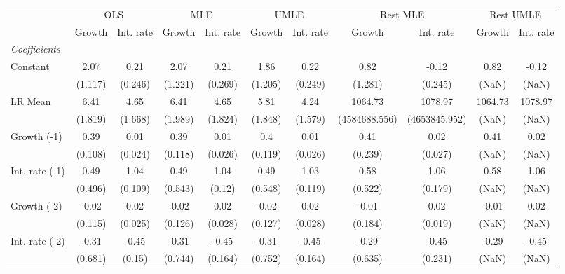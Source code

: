 \begin{table}[htbp] 
	\centering
	\begin{tabular}{@{\extracolsep{4pt}}lcccccccccc@{}}		\hline\hline
		 		 & \multicolumn{2}{c}{OLS} &\multicolumn{2}{c}{MLE} &\multicolumn{2}{c}{UMLE} &\multicolumn{2}{c}{Rest MLE} &\multicolumn{2}{c}{Rest UMLE} \\ 
 		 & Growth 	 & Int. rate 	 & Growth 	 & Int. rate 	 & Growth 	 & Int. rate 	 & Growth 	 & Int. rate 	 & Growth 	 & Int. rate\\\cline{2-3}\cline{4-5}\cline{6-7}\cline{8-9}\cline{10-11}
\rule{0pt}{4ex} 
 \emph{Coefficients} 	  		 & 		 & 		 & 		 & 		 & 		 & 		 & 		 & 		 & 		 &\\ 
\quad Constant 	 & 2.07 	 & 0.21 	 & 2.07 	 & 0.21 	 & 1.86 	 & 0.22 	 & 0.82 	 & -0.12 	 & 0.82 	 & -0.12	 \\ 
 		 & (1.117) 	 & (0.246) 	 & (1.221) 	 & (0.269) 	 & (1.205) 	 & (0.249) 	 & (1.281) 	 & (0.245) 	 & (NaN) 	 & (NaN) 	 \\ 
\quad LR Mean 	 & 6.41 	 & 4.65 	 & 6.41 	 & 4.65 	 & 5.81 	 & 4.24 	 & 1064.73 	 & 1078.97 	 & 1064.73 	 & 1078.97	 \\ 
 		 & (1.819) 	 & (1.668) 	 & (1.989) 	 & (1.824) 	 & (1.848) 	 & (1.579) 	 & (4584688.556) 	 & (4653845.952) 	 & (NaN) 	 & (NaN) 	 \\ 
\quad Growth (-1) 	 &0.39 	 & 0.01 	 & 0.39 	 & 0.01 	 & 0.4 	 & 0.01 	 & 0.41 	 & 0.02 	 & 0.41 	 & 0.02	 \\ 
 		 & (0.108) 	 & (0.024) 	 & (0.118) 	 & (0.026) 	 & (0.119) 	 & (0.026) 	 & (0.239) 	 & (0.027) 	 & (NaN) 	 & (NaN) 	 \\ 
\quad Int. rate (-1) 	 &0.49 	 & 1.04 	 & 0.49 	 & 1.04 	 & 0.49 	 & 1.03 	 & 0.58 	 & 1.06 	 & 0.58 	 & 1.06	 \\ 
 		 & (0.496) 	 & (0.109) 	 & (0.543) 	 & (0.12) 	 & (0.548) 	 & (0.119) 	 & (0.522) 	 & (0.179) 	 & (NaN) 	 & (NaN) 	 \\ 
\quad Growth (-2) 	 &-0.02 	 & 0.02 	 & -0.02 	 & 0.02 	 & -0.02 	 & 0.02 	 & -0.01 	 & 0.02 	 & -0.01 	 & 0.02	 \\ 
 		 & (0.115) 	 & (0.025) 	 & (0.126) 	 & (0.028) 	 & (0.127) 	 & (0.028) 	 & (0.184) 	 & (0.019) 	 & (NaN) 	 & (NaN) 	 \\ 
\quad Int. rate (-2) 	 &-0.31 	 & -0.45 	 & -0.31 	 & -0.45 	 & -0.31 	 & -0.45 	 & -0.29 	 & -0.45 	 & -0.29 	 & -0.45	 \\ 
 		 & (0.681) 	 & (0.15) 	 & (0.744) 	 & (0.164) 	 & (0.752) 	 & (0.164) 	 & (0.635) 	 & (0.231) 	 & (NaN) 	 & (NaN) 	 \\ 

\end{tabular}
\end{table}
